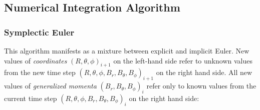 \subsection{Numerical Integration Algorithm}

\subsubsection{Symplectic Euler}

This algorithm manifests as a mixture between explicit and implicit Euler. New values of \emph{coordinates} \((R, \theta, \phi)_{i+1}\) on the left-hand side refer to unknown values from the new time step \((R, \theta, \phi, B_r, B_\theta, B_\phi)_{i+1}\) on the right hand side. All new values of \emph{generalized momenta} \((B_r, B_\theta, B_\phi)_{i}\) refer only to known values from the current time step \((R, \theta, \phi, B_r, B_\theta, B_\phi)_{i}\) on the right hand side:

